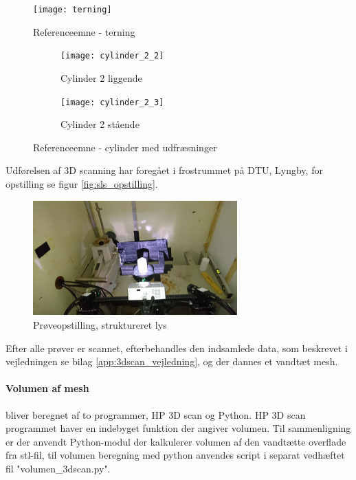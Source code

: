 %
\begin{figure}
\centering
\texttt{[image: terning]}
\caption{Referenceemne - terning}
\label{fig:terning}
\end{figure}
%
%
\begin{figure}
        \begin{subfigure}[b]{0.45\textwidth}
                \texttt{[image: cylinder\_2\_2]}
                \caption{Cylinder 2 liggende}
                \label{fig:cylinder 2 liggende}
        \end{subfigure}\hfill %
        \begin{subfigure}[b]{0.40\textwidth}
                \texttt{[image: cylinder\_2\_3]}
                \caption{Cylinder 2 stående}
                \label{fig:cylinder2}
        \end{subfigure}%
        \caption{Referenceemne - cylinder med udfræsninger}\label{fig:cylinder}
\end{figure}
%

Udførelsen af 3D scanning har foregået i frostrummet på DTU, Lyngby, for opstilling se figur \vref{fig:sls_opstilling}. 
%
\begin{figure}
\centering
\includegraphics[width=0.7\textwidth]{opstilling_sls_red}
\caption{Prøveopstilling, struktureret lys}
\label{fig:sls_opstilling}
\end{figure}
%

%
%
\noindent Efter alle prøver er scannet, efterbehandles den indsamlede data, som beskrevet i vejledningen se bilag \vref{app:3dscan_vejledning}, og der dannes et vandtæt mesh. 
%
\paragraph{Volumen af mesh} bliver beregnet af to programmer, HP 3D scan og Python. HP 3D scan programmet haver en indebyget funktion der angiver volumen. Til sammenligning er der anvendt Python-modul der kalkulerer volumen af den vandtætte overflade fra stl-fil, til volumen beregning med python anvendes script i separat vedhæftet fil "volumen\_3dscan.py".


